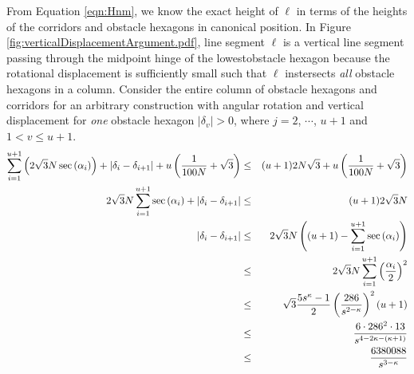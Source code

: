 From Equation \ref{eqn:Hnm}, we know the exact height of $\ell$ in terms of the heights of the corridors and obstacle hexagons in canonical position.
In Figure \ref{fig:verticalDisplacementArgument.pdf}, line segment $\ell$ is a vertical line segment passing through  the midpoint hinge of the lowestobstacle hexagon  because the rotational displacement is sufficiently small such that $\ell$ instersects \textit{all} obstacle hexagons in a column.  
Consider the entire column of obstacle hexagons and corridors for an arbitrary construction with angular rotation and vertical displacement for \textit{one} obstacle hexagon $\vert \delta_v \vert > 0$, where $j=2$, $\cdots$, $u+1$ and $1 < v \leq u+1$.
\begin{eqnarray*}
\sum_{i=1}^{u+1} \left( 2 \sqrt{3} N \sec \left(  \alpha_i \right) \right) + \left\vert \delta_i - \delta_{i+1} \right\vert + u \left( \frac{1}{100N}+\sqrt{3} \right) &\leq& (u+1) 2 N \sqrt{3} + u  \left( \frac{1}{100N}+\sqrt{3} \right)\\
2 \sqrt{3} N \sum_{i=1}^{u+1} \sec \left(  \alpha_i \right) +  \left\vert \delta_i - \delta_{i+1} \right\vert &\leq& (u+1) 2 \sqrt{3} N \\
\left\vert \delta_i - \delta_{i+1} \right\vert &\leq&  2 \sqrt{3} N \left( (u+1) - \sum_{i=1}^{u+1} \sec \left(  \alpha_i \right) \right)\\
&\leq& 2 \sqrt{3} N \sum_{i=1}^{u+1} \left( \frac{\alpha_i}{2} \right)^2\\
&\leq&  \sqrt{3} \frac{5s^\kappa - 1}{2} \left( \frac{286}{s^{2-\kappa}} \right)^2 (u+1)\\ 
&\leq& \frac{6 \cdot 286^2 \cdot 13}{s^{4-2\kappa - \left( \kappa + 1 \right)}}\\
&\leq&\frac{6380088}{s^{3-\kappa}}
\end{eqnarray*}

